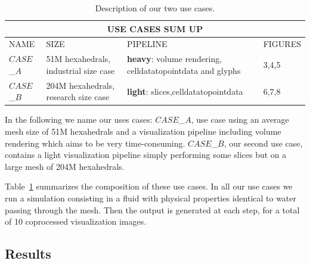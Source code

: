 \begin{table}
\centering
\begin{tabular}{|p{1.5cm}|p{3.0cm}|p{2.70cm}|p{1.50cm}|}
\hline
\multicolumn{4}{|c|}{\textbf{USE CASES SUM UP}}\\
\hline
NAME & SIZE & PIPELINE & FIGURES \\
\hline
$CASE$\_$A$ & 51M hexahedrals, \newline industrial size case & \textbf{heavy}: \newline volume rendering, \newline celldatatopointdata \newline and glyphs  & 3,4,5   \\
\hline
$CASE$\_$B$ & 204M hexahedrals, \newline research size case & \textbf{light}: \newline 9 slices,\newline celldatatopointdata  & 6,7,8   \\
\hline
\end{tabular}
\caption{Description of our two use cases.}
\label{fig:tab}
\vspace{-0.15in}
\end{table}
In the following we name our uses cases:
$CASE$\_$A$, use case using an average mesh size of 51M hexahedrals and a
visualization pipeline including volume rendering which aims to be very time-consuming.
$CASE$\_$B$, our second use case, contains a light visualization pipeline simply
performing some slices but on a large mesh of 204M hexahedrals.

Table~\ref{fig:tab} summarizes the composition of these use cases. In all our use cases we
run a simulation consisting in a fluid with physical properties identical to
water passing through the mesh. Then the output is generated at each step, for a
total of 10 coprocessed visualization images.

\subsection{Results}

